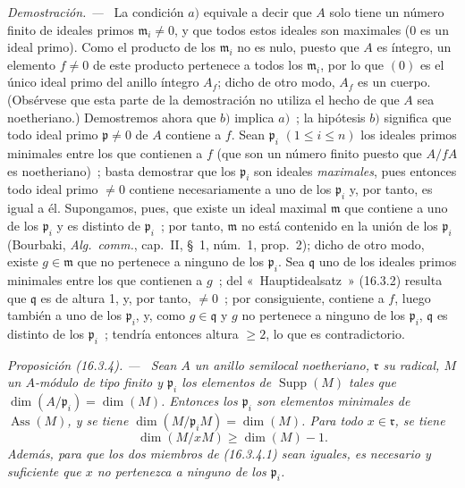 \documentclass[10pt,oneside]{book}
\makeatletter
\newcommand{\setmanualcurrentlabel}[1]{\def\@currentlabel{#1}}
\newenvironment{proposition}[1][]{%
  \setmanualcurrentlabel{#1}\par\medskip\noindent\itshape Proposición (#1). ---\ }{\par}
\newenvironment{proof}{%
  \par\medskip\noindent\textit{Demostración. ---\ }}{\par}
\providecommand{\setmin}{-}%
\makeatother
\begin{document}
\begin{proof}
La condición $a)$ equivale a decir que $A$ solo tiene un número finito de
ideales primos $\mathfrak{m}_i\neq0$, y que todos estos ideales son maximales
($0$ es un ideal primo). Como el producto de los $\mathfrak{m}_i$ no es nulo,
puesto que $A$ es íntegro, un elemento $f\neq0$ de este producto pertenece a
todos los $\mathfrak{m}_i$, por lo que $(0)$ es el único ideal primo del anillo
íntegro $A_f$; dicho de otro modo, $A_f$ es un cuerpo. (Obsérvese que esta
parte de la demostración no utiliza el hecho de que $A$ sea noetheriano.)
Demostremos ahora que $b)$ implica $a)$~; la hipótesis $b)$ significa que todo
ideal primo $\mathfrak{p}\neq0$ de $A$ contiene a $f$. Sean $\mathfrak{p}_i$
$(1\leq i\leq n)$ los ideales primos minimales entre los que contienen a $f$
(que son un número finito puesto que $A/fA$ es noetheriano)~; basta demostrar
que los $\mathfrak{p}_i$ son ideales \emph{maximales}, pues entonces todo ideal
primo $\neq0$ contiene necesariamente a uno de los $\mathfrak{p}_i$ y, por
tanto, es igual a él. Supongamos, pues, que existe un ideal maximal
$\mathfrak{m}$ que contiene a uno de los $\mathfrak{p}_i$ y es distinto de
$\mathfrak{p}_i$~; por tanto, $\mathfrak{m}$ no está contenido en la unión de
los $\mathfrak{p}_i$ (Bourbaki, \emph{Alg.~comm.}, cap.~II, \S~1, núm.~1,
prop.~2); dicho de otro modo, existe $g\in\mathfrak{m}$ que no pertenece a
ninguno de los $\mathfrak{p}_i$. Sea $\mathfrak{q}$ uno de los ideales primos
minimales entre los que contienen a $g$~; del «~Hauptidealsatz~» (16.3.2)
resulta que $\mathfrak{q}$ es de altura 1, y, por tanto, $\neq0$~; por
consiguiente, contiene a $f$, luego también a uno de los $\mathfrak{p}_i$, y,
como $g\in\mathfrak{q}$ y $g$ no pertenece a ninguno de los
$\mathfrak{p}_i$, $\mathfrak{q}$ es distinto de los $\mathfrak{p}_i$~; tendría
entonces altura $\geq2$, lo que es contradictorio.
\end{proof}

\begin{proposition}[16.3.4]
\label{0.16.3.4-es}
Sean $A$ un anillo semilocal noetheriano, $\mathfrak{r}$ su radical, $M$ un
$A$-módulo de tipo finito y $\mathfrak{p}_i$ los elementos de
$\operatorname{Supp}(M)$ tales que
$\dim(A/\mathfrak{p}_i)=\dim(M)$. Entonces los $\mathfrak{p}_i$ son elementos
minimales de $\operatorname{Ass}(M)$, y se tiene
$\dim(M/\mathfrak{p}_iM)=\dim(M)$. Para todo $x\in\mathfrak{r}$, se tiene
\begin{equation}
\label{0.16.3.4.1-es}
\tag{16.3.4.1}
  \dim(M/xM)\geq\dim(M)\setmin 1.
\end{equation}
Además, para que los dos miembros de \textup{(16.3.4.1)} sean iguales, es necesario y
suficiente que $x$ no pertenezca a ninguno de los $\mathfrak{p}_i$.
\end{proposition}
\end{document}
